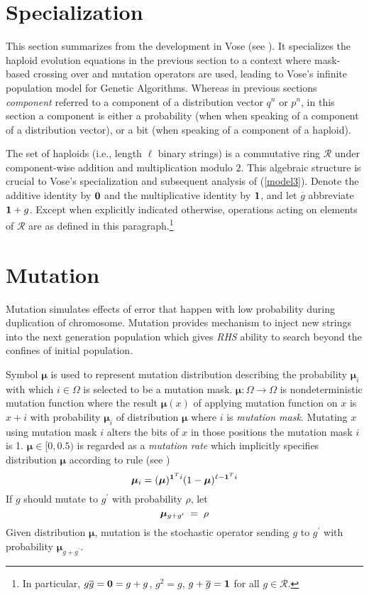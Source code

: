 \section{Specialization}\label{specialize}
This section summarizes from the development in Vose (see \cite{Vose1999}).
It specializes the haploid evolution equations in the previous section 
to a context where mask-based crossing over and mutation operators are used, 
leading to Vose's infinite population model for Genetic Algorithms.  Whereas 
in previous sections {\em component} referred to a component
of a distribution vector $q^n$ or $p^n$, in this section a component
is either a probability (when when speaking of a component of a
distribution vector), or a bit (when speaking of a component of a
haploid).

The set of haploids (i.e., length $\ell$ binary strings) is a
commutative ring $\mathcal{R}$ under component-wise addition and
multiplication modulo $2$.  This algebraic structure is crucial to
Vose's specialization and subsequent analysis of
(\ref{model3}). Denote the additive identity by ${\bf 0}$ and the
multiplicative identity by ${\bf 1}$, and let $\overline{g}$
abbreviate ${\bf 1} + g$.  Except when explicitly indicated otherwise,
operations acting on elements of $\mathcal{R}$ are as defined in this
paragraph.\footnote{In particular, $g \overline{g} = {\bf 0} = g+g$,
  $g^2 = g$, $g + \overline{g} = {\bf 1}$ for all $g \in
  \mathcal{R}$.}

\section{Mutation}
Mutation simulates effects of error that happen with low probability during duplication of chromosome. Mutation provides mechanism to inject new strings into the next generation population which gives {\em RHS} ability to search beyond the confines of initial population.

Symbol $\bm{\mu}$ is used to represent mutation distribution describing the probability $\bm{\mu}_i$ with which $i \in \Omega$ is selected to be a mutation mask. $\bm{\mu} : \Omega \rightarrow \Omega$ is nondeterministic mutation function where the result $\bm{\mu}(x)$ of applying mutation function on $x$ is $x + i$ with probability $\bm{\mu}_i$ of distribution $\bm{\mu}$ where $i$ is {\em mutation mask}. Mutating $x$ using mutation mask $i$ alters the bits of $x$ in those positions the mutation mask $i$ is 1.
$\bm{\mu} \in [0, 0.5)$ is regarded as a {\em mutation rate} which implicitly specifies distribution $\bm{\mu}$ according to rule (see \cite{VoseWright1998})
\[
\bm{\mu}_i = (\bm{\mu})^{{\bf 1}^Ti} (1-\bm{\mu})^{\ell- {\bf 1}^Ti}
\]
If $g$ should mutate to $g^\prime$ with probability $\rho$,
let\\[-0.2in]
\[
\bm{\mu}_{g + g^\prime} \; = \; \rho\\[0.05in]
\]
Given distribution $\bm{\mu}$, mutation is the stochastic operator sending
$g$ to $g^\prime$ with probability $\bm{\mu}_{g + g^\prime}$.


